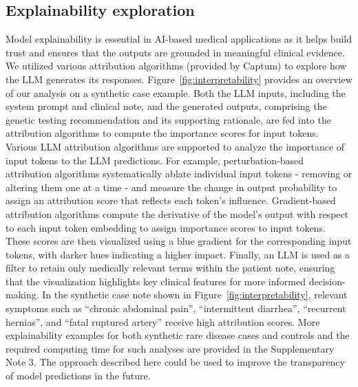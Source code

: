 \documentclass[fleqn,10pt]{wlscirep}
\begin{document}
\subsection*{Explainability exploration}
Model explainability is essential in AI-based medical applications as it helps build trust and ensures that the outputs are grounded in meaningful clinical evidence. We  utilized various attribution algorithms (provided by Captum\cite{kokhlikyan2020captum}) to explore how the LLM generates its responses. Figure~\ref{fig:interpretability} provides an overview of our analysis on a synthetic case example. Both the LLM inputs, including the system prompt and clinical note, and the generated outputs, comprising the genetic testing recommendation and its supporting rationale, are fed into the attribution algorithms to compute the importance scores for input tokens. Various LLM attribution algorithms are supported to analyze the importance of input tokens to the LLM predictions. For example, perturbation-based attribution algorithms systematically ablate individual input tokens - removing or altering them one at a time - and measure the change in output probability to assign an attribution score that reflects each token’s influence. Gradient-based attribution algorithms compute the derivative of the model’s output with respect to each input token embedding to assign importance scores to input tokens.\cite{sundararajan2017axiomatic} These scores are then visualized using a blue gradient for the corresponding input tokens, with darker hues indicating a higher impact. Finally, an LLM is used as a filter to retain only medically relevant terms within the patient note, ensuring that the visualization highlights key clinical features for more informed decision-making. In the synthetic case note shown in Figure~\ref{fig:interpretability}, relevant symptoms such as ``chronic abdominal pain'', ``intermittent diarrhea'', ``recurrent hernias'', and ``fatal ruptured artery'' receive high attribution scores. More explainability examples for both synthetic rare disease cases and controls and the required computing time for such analyses are provided in the Supplementary Note 3. The approach described here could be used to improve the transparency of model predictions in the future.



\end{document}
